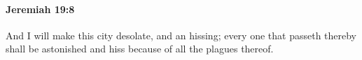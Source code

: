 
		\paragraph{Jeremiah 19:8} %
			\label{JEREMIAH-19-8}

			And I will make this city desolate, and an hissing; every one that passeth thereby shall be astonished and hiss because of all the plagues thereof.


